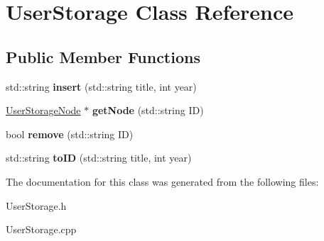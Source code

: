 \hypertarget{class_user_storage}{}\section{User\+Storage Class Reference}
\label{class_user_storage}
\subsection*{Public Member Functions}
\begin{DoxyCompactItemize}
\item 
\mbox{\label{class_user_storage_a9f7e580fafcd798cb9b440cbaba15e87}} 
std\+::string {\bfseries insert} (std\+::string title, int year)
\item 
\mbox{\label{class_user_storage_a5018e12946e2f827ec979cab39cb1a5f}} 
\hyperlink{class_user_storage_node}{User\+Storage\+Node} $\ast$ {\bfseries get\+Node} (std\+::string ID)
\item 
\mbox{\label{class_user_storage_ab5dc582ec267b47d5542ad1fcf69f938}} 
bool {\bfseries remove} (std\+::string ID)
\item 
\mbox{\label{class_user_storage_ac9b1242e91c41f01ca97fdc20e3f9f1e}} 
std\+::string {\bfseries to\+ID} (std\+::string title, int year)
\end{DoxyCompactItemize}


The documentation for this class was generated from the following files\+:\begin{DoxyCompactItemize}
\item 
User\+Storage.\+h\item 
User\+Storage.\+cpp\end{DoxyCompactItemize}
